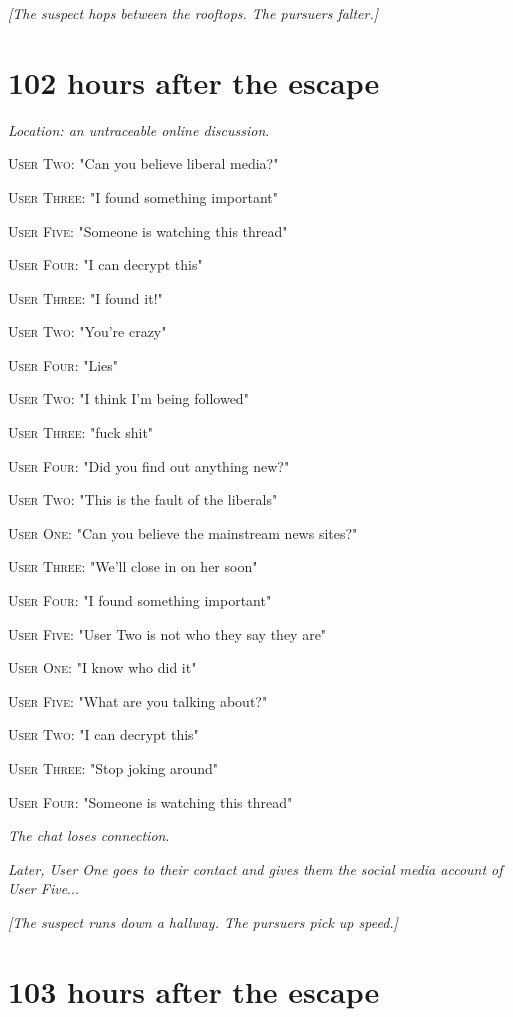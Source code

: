 \documentclass{report}
\begin{document}
\textit{[The suspect hops between the rooftops. The pursuers falter.]}


\section*{102 \small{hours after the escape}}

\textit{Location: an untraceable online discussion}. 

\textsc{User Two}: "Can you believe liberal media?" 

\textsc{User Three}: "I found something important" 

\textsc{User Five}: "Someone is watching this thread" 

\textsc{User Four}: "I can decrypt this" 

\textsc{User Three}: "I found it!" 

\textsc{User Two}: "You're crazy" 

\textsc{User Four}: "Lies" 

\textsc{User Two}: "I think I'm being followed" 

\textsc{User Three}: "fuck shit" 

\textsc{User Four}: "Did you find out anything new?" 

\textsc{User Two}: "This is the fault of the liberals" 

\textsc{User One}: "Can you believe the mainstream news sites?" 

\textsc{User Three}: "We'll close in on her soon" 

\textsc{User Four}: "I found something important" 

\textsc{User Five}: "User Two is not who they say they are" 

\textsc{User One}: "I know who did it" 

\textsc{User Five}: "What are you talking about?" 

\textsc{User Two}: "I can decrypt this" 

\textsc{User Three}: "Stop joking around" 

\textsc{User Four}: "Someone is watching this thread" 

\textit{The chat loses connection}. 

\textit{Later, User One goes to their contact and gives them the social media account of User Five}...

\textit{[The suspect runs down a hallway. The pursuers pick up speed.]}


\section*{103 \small{hours after the escape}}
\end{document}
